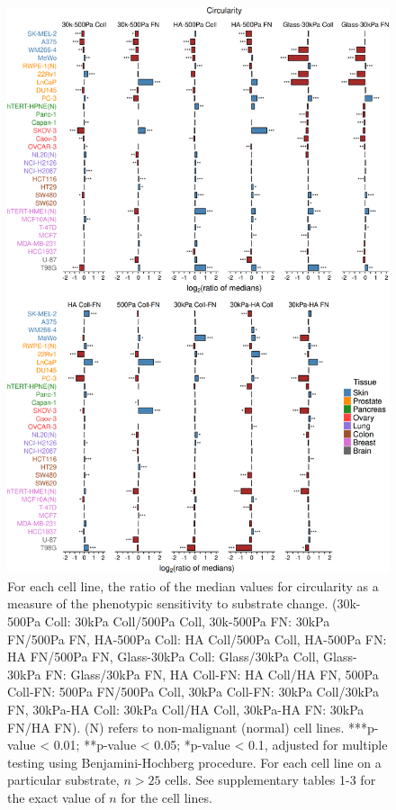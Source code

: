 \documentclass[11pt,letterpaper,english,oneside]{article} %
\begin{document}
\begin{figure}[H]
    \centering
    \includegraphics[scale=0.13]{../Figures/Supplementary_Figure3/supplementary_figure3.png}
    \caption{For each cell line, the ratio of the median values for circularity as a measure of the phenotypic sensitivity to substrate change. 
    (30k-500Pa Coll: 30kPa Coll/500Pa Coll, 30k-500Pa FN: 30kPa FN/500Pa FN, HA-500Pa Coll: HA Coll/500Pa Coll, HA-500Pa  FN: HA FN/500Pa FN, Glass-30kPa Coll: Glass/30kPa Coll, Glass-30kPa FN: Glass/30kPa FN, 
    HA Coll-FN: HA Coll/HA FN, 500Pa Coll-FN: 500Pa FN/500Pa Coll, 30kPa Coll-FN: 30kPa Coll/30kPa FN, 30kPa-HA Coll: 30kPa Coll/HA Coll, 30kPa-HA FN: 30kPa FN/HA FN). (N) refers to non-malignant (normal) cell lines.
    ***p-value < 0.01; **p-value < 0.05; *p-value < 0.1, adjusted for multiple testing using Benjamini-Hochberg procedure. For each cell line on a particular substrate, $n > 25$ cells. See supplementary tables 1-3 for the exact value of $n$ for the cell lines.}
    \label{fig:fig3}
\end{figure}
\end{document}
